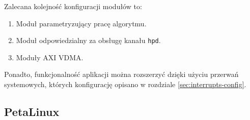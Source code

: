 Zalecana kolejność konfiguracji modułów to:
\begin{enumerate}
	\item Moduł parametryzujący pracę algorytmu.
	\item Moduł odpowiedzialny za obsługę kanału \texttt{hpd}.
	\item Moduły AXI VDMA.
\end{enumerate}

Ponadto, funkcjonalność aplikacji można rozszerzyć dzięki użyciu przerwań systemowych, których konfigurację opisano w rozdziale \ref{sec:interrupts-config}.

\subsection{PetaLinux}

\lipsum[1-3]
